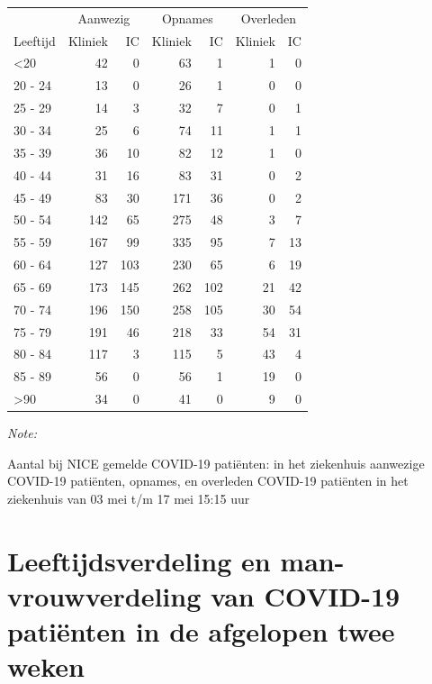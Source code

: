 \documentclass[
  english,
  man,floatsintext]{apa6}
\begin{document}
\begin{table}
\centering\begingroup\fontsize{10}{12}\selectfont

\begin{threeparttable}
\begin{tabular}{lrrrrrr}
\toprule
\multicolumn{1}{c}{ } & \multicolumn{2}{c}{Aanwezig} & \multicolumn{2}{c}{Opnames} & \multicolumn{2}{c}{Overleden} \\
\cmidrule(l{3pt}r{3pt}){2-3} \cmidrule(l{3pt}r{3pt}){4-5} \cmidrule(l{3pt}r{3pt}){6-7}
Leeftijd & Kliniek & IC & Kliniek & IC & Kliniek & IC\\
\midrule
<20 & 42 & 0 & 63 & 1 & 1 & 0\\
20 - 24 & 13 & 0 & 26 & 1 & 0 & 0\\
25 - 29 & 14 & 3 & 32 & 7 & 0 & 1\\
30 - 34 & 25 & 6 & 74 & 11 & 1 & 1\\
35 - 39 & 36 & 10 & 82 & 12 & 1 & 0\\
40 - 44 & 31 & 16 & 83 & 31 & 0 & 2\\
45 - 49 & 83 & 30 & 171 & 36 & 0 & 2\\
50 - 54 & 142 & 65 & 275 & 48 & 3 & 7\\
55 - 59 & 167 & 99 & 335 & 95 & 7 & 13\\
60 - 64 & 127 & 103 & 230 & 65 & 6 & 19\\
65 - 69 & 173 & 145 & 262 & 102 & 21 & 42\\
70 - 74 & 196 & 150 & 258 & 105 & 30 & 54\\
75 - 79 & 191 & 46 & 218 & 33 & 54 & 31\\
80 - 84 & 117 & 3 & 115 & 5 & 43 & 4\\
85 - 89 & 56 & 0 & 56 & 1 & 19 & 0\\
>90 & 34 & 0 & 41 & 0 & 9 & 0\\
\bottomrule
\end{tabular}
\begin{tablenotes}
\item \textit{Note: } 
\item Aantal bij NICE gemelde COVID-19 patiënten: in het ziekenhuis aanwezige COVID-19 patiënten, opnames, en overleden COVID-19 patiënten in het ziekenhuis van 03 mei t/m 17 mei 15:15 uur
\end{tablenotes}
\end{threeparttable}
\endgroup{}
\end{table}

\newpage

\hypertarget{leeftijdsverdeling-en-man-vrouwverdeling-van-covid-19-patiuxebnten-in-de-afgelopen-twee-weken}{%
\section{Leeftijdsverdeling en man-vrouwverdeling van COVID-19 patiënten in de afgelopen twee weken}\label{leeftijdsverdeling-en-man-vrouwverdeling-van-covid-19-patiuxebnten-in-de-afgelopen-twee-weken}}
\end{document}
